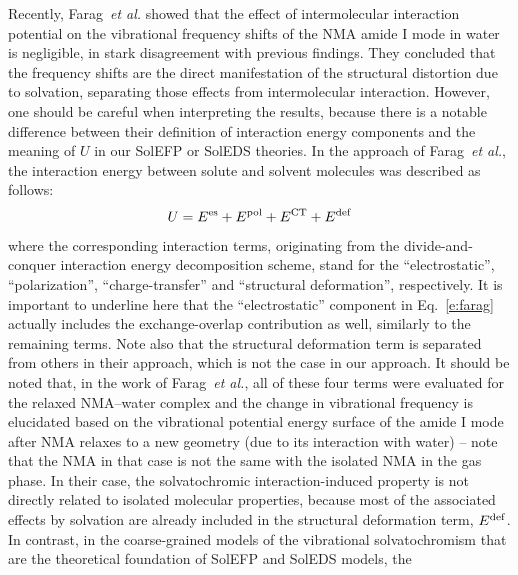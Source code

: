\documentclass[b5paper,oneside,fleqn,11pt]{book}
\begin{document}
\begin{refsection}
Recently, Farag~\emph{et al.} \citep{Farag.Ruiz-Lopez.Bastida.Monard.Ingrosso.JPCB.2015} 
showed that the effect of intermolecular
interaction potential on the vibrational frequency
shifts of the NMA amide I mode in water is negligible, in
stark disagreement with previous findings. \citep{Blasiak.Lee.Cho.JCP.2013,Blasiak.Cho.JCP.2014} 
They concluded that the frequency shifts are the
direct manifestation of the structural distortion due to solvation,
separating those effects from intermolecular interaction.
However, one should be careful when interpreting the results,
because there is a notable difference between their definition
of interaction energy components and the meaning of $U$ in our
SolEFP or SolEDS theories. In the approach of Farag~\emph{et al.},
the interaction energy between solute and solvent molecules
was described as follows:
%
\begin{equation} \label{e:farag}
 U =  E^{\rm es} + E^{\rm pol} + E^{\rm CT} + E^{\rm def}
\end{equation}
%
where the corresponding interaction terms, originating from
the divide\hyp{}and\hyp{}conquer interaction energy decomposition
scheme, \citep{vanderVaart.Merz.JPCA.1999} 
stand for the ``electrostatic'', ``polarization'', ``charge\hyp{}transfer''
and ``structural deformation'', respectively. It is
important to underline here that the ``electrostatic'' component
in Eq.~\eqref{e:farag} actually includes the exchange\hyp{}overlap contribution
as well, similarly to the remaining terms. \citep{vanderVaart.Merz.JPCA.1999} 
Note also that the
structural deformation term is separated from others in their
approach, which is not the case in our approach. 
It should be noted that, in the work of Farag~\emph{et al.}, 
all of these four terms were evaluated for the relaxed
NMA--water complex and the change in vibrational frequency
is elucidated based on the vibrational potential energy surface
of the amide I mode after NMA relaxes to a new geometry (due
to its interaction with water) -- note that the NMA in that case
is not the same with the isolated NMA in the gas phase. In their
case, the solvatochromic interaction\hyp{}induced property is not
directly related to isolated molecular properties, because most
of the associated effects by solvation are already included in
the structural deformation term, $E^{\rm def}$. In contrast, in the coarse\hyp{}grained
models of the vibrational solvatochromism \citep{Buckingham.ProcRSocLondonA.1958,
Buckingham.ProcRSocLondonA.1960,
Buckingham.TransFaradaySoc.1960,
Cho.JCP.2003,Cho.JCP.2009} 
that are
the theoretical foundation of SolEFP and SolEDS models, the

\end{refsection}
\end{document}
